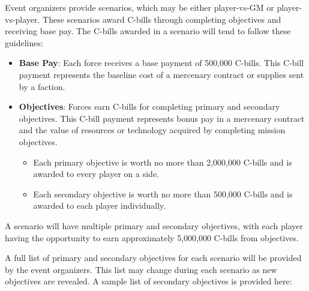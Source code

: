 Event organizers provide scenarios, which may be either player-vs-GM or player-vs-player.
These scenarios award C-bills through completing objectives and receiving base pay.
The C-bills awarded in a scenario will tend to follow these guidelines:

\begin{itemize}

\item {\bfseries Base Pay}: Each force receives a base payment of 500,000 C-bills.
This C-bill payment represents the baseline cost of a mercenary contract or supplies sent by a faction.

\item {\bfseries Objectives}: Forces earn C-bills for completing primary and secondary objectives.
This C-bill payment represents bonus pay in a mercenary contract and the value of resources or technology acquired by completing mission objectives.

\begin{itemize}

\item Each primary objective is worth no more than 2,000,000 C-bills and is awarded to every player on a side.

\item Each secondary objective is worth no more than 500,000 C-bills and is awarded to each player individually.

\end{itemize}

\end{itemize}

A scenario will have multiple primary and secondary objectives, with each player having the opportunity to earn approximately 5,000,000 C-bills from objectives.

A full list of primary and secondary objectives for each scenario will be provided by the event organizers.
This list may change during each scenario as new objectives are revealed.
A sample list of secondary objectives is provided here:

